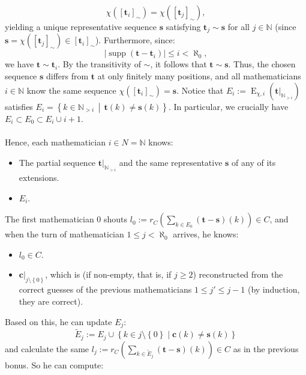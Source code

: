 \documentclass[11pt, a4paper, oneside]{article}
\theoremstyle{remark}
\theoremstyle{lemma}
\begin{document}
\[
\chi \left( \left[\mathbf{t}_i\right]_{\sim} \right) = \chi \left( \left[\mathbf{t}_j\right]_{\sim} \right),
\]
yielding a unique representative sequence \(\mathbf{s}\) satisfying \(\mathbf{t}_j \sim \mathbf{s}\) for all \( j \in \mathbb{N} \) (since \(\mathbf{s} = \chi \left( \left[\mathbf{t}_j\right]_{\sim} \right) \in \left[\mathbf{t}_i\right]_{\sim} \)). Furthermore, since:
\[
\left|\operatorname{supp} \left( \mathbf{t} - \mathbf{t}_i \right)\right| \leq i < \aleph_0,
\]
we have \(\mathbf{t} \sim \mathbf{t}_i\). By the transitivity of \(\sim\), it follows that \(\mathbf{t} \sim \mathbf{s}\). Thus, the chosen sequence \(\mathbf{s}\) differs from \(\mathbf{t}\) at only finitely many positions, and all mathematicians \( i \in \mathbb{N} \) know the same sequence \(\chi \left( \left[\mathbf{t}_i\right]_{\sim} \right) = \mathbf{s}\). Notice that \(E_i := \operatorname{E}_{\chi, i} \left( \left.\mathbf{t} \right|_{\mathbb{N}_{>i}} \right)\) satisfies \(E_i = \left\{ k \in \mathbb{N}_{>i} \,\middle|\, \mathbf{t}(k) \neq \mathbf{s}(k) \right\}\). In particular, we crucially have \( E_i \subset E_0 \subset E_i \cup i+1 \).
\\\\
Hence, each mathematician \(i \in N = \mathbb{N}\) knows:
\begin{itemize}
    \item The partial sequence \(\left.\mathbf{t}\right|_{\mathbb{N}_{>i}}\) and the same representative \(\mathbf{s}\) of any of its extensions.
    \item \(E_i\).
\end{itemize}
The first mathematician \(0\) shouts \(l_0 := r_{C}\left(\sum_{k \in E_0} \left( \mathbf{t} - \mathbf{s} \right)(k)\right) \in C\), and when the turn of mathematician \(1 \leq j < \aleph_0\) arrives, he knows:
\begin{itemize}
    \item \(l_0 \in C\).
    \item \(\left.\mathbf{c}\right|_{j \setminus \left\{0\right\}}\), which is (if non-empty, that is, if \(j \geq 2\)) reconstructed from the correct guesses of the previous mathematicians \(1 \leq j' \leq j - 1\) (by induction, they are correct).
\end{itemize}
Based on this, he can update \(E_j\):
\[
\tilde{E}_j := E_j \cup \left\{ k \in j \setminus \left\{0\right\} \mid \mathbf{c}(k) \neq \mathbf{s}(k) \right\}
\]
and calculate the same \(l_j := r_{C}\left(\sum_{k \in \tilde{E}_j} \left( \mathbf{t} - \mathbf{s} \right)(k)\right) \in C\) as in the previous bonus. So he can compute:
\end{document}
